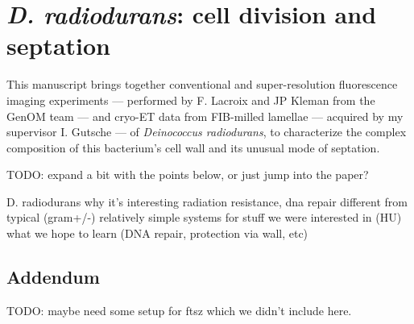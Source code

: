 \chapter{\textit{D. radiodurans}: cell division and septation}\label{drad}

This manuscript brings together conventional and super-resolution fluorescence imaging experiments --- performed by F. Lacroix and JP Kleman from the GenOM team --- and cryo-ET data from FIB-milled lamellae --- acquired by my supervisor I. Gutsche --- of \textit{Deinococcus radiodurans}, to characterize the complex composition of this bacterium's cell wall and its unusual mode of septation.

TODO: expand a bit with the points below, or just jump into the paper?

\begin{outline}
\1 D. radiodurans
    \2 why it's interesting
        \3 radiation resistance, dna repair
        \3 different from typical (gram+/-)
        \3 relatively simple systems for stuff we were interested in (HU)
    \2 what we hope to learn (DNA repair, protection via wall, etc)
\end{outline}

\localtableofcontents
\newpage

\newpage

\section{Addendum}

TODO: maybe need some setup for ftsz which we didn't include here.
